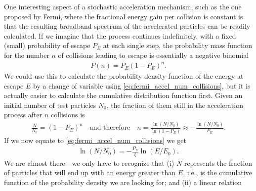 One interesting aspect of a stochastic acceleration mechanism, such as the one proposed
by Fermi, where the fractional energy gain per collision is constant is that the
resulting broadband spectrum of the accelerated particles can be readily calculated.
If we imagine that the process continues indefinitely, with a fixed (small) probability
of escape $P_E$ at each single step, the probability mass function for the number
$n$ of collisions leading to escape is essentially a negative binomial
\begin{align}\label{eq:num_collisions_pmf}
 P(n) = P_E(1 - P_E)^n.
\end{align}
We could use this to calculate the probability density function of the energy at escape
$E$ by a change of variable using \eqref{eq:fermi_accel_num_collisions}, but it is actually easier to calculate the cumulative distribution function first.
Given an initial number of test particles $N_0$, the fraction of them still in the
acceleration process after $n$ collisions is
\begin{align*}
  \frac{N}{N_0} = (1 - P_E)^n \quad\text{and therefore}\quad
  n = \frac{\ln(N / N_0)}{\ln(1 - P_E)} \approx -\frac{\ln(N / N_0)}{P_E}.
\end{align*}
If we now equate to \eqref{eq:fermi_accel_num_collisions} we get
\begin{align*}
  \ln(N / N_0) = -\frac{P_E}{\xi} \ln(E / E_0).
\end{align*}
We are almost there---we only have to recognize that (i) $N$ represents the fraction of
particles that will end up with an energy greater than $E$, i.e., is the cumulative
function of the probability density we are looking for; and (ii) a linear relation
